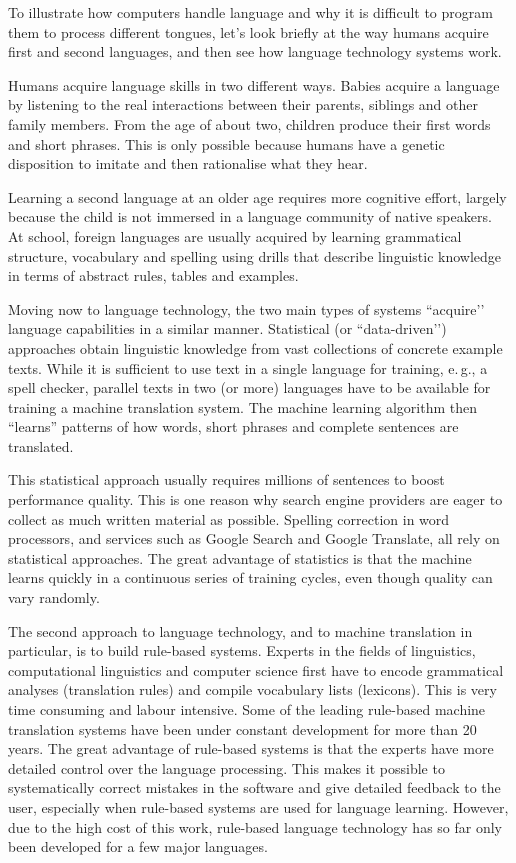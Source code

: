 \documentclass[]{../../metanetpaper}
\begin{document}
\begin{multicols}{2}
To illustrate how computers handle language and why it is difficult to program them to process different tongues, let’s look briefly at the way humans acquire first and second languages, and then see how language technology systems work.

Humans acquire language skills in two different ways. Babies acquire a language by listening to the real interactions between their parents, siblings and other family members. From the age of about two, children produce their first words and short phrases. This is only possible because humans have a genetic disposition to imitate and then rationalise what they hear. 

Learning a second language at an older age requires more cognitive effort, largely because the child is not immersed in a language community of native speakers. At school, foreign languages are usually acquired by learning grammatical structure, vocabulary and spelling using drills that describe linguistic knowledge in terms of abstract rules, tables and examples.


Moving now to language technology, the two main types of systems ``acquire'’ language capabilities in a similar manner. Statistical (or ``data-driven’') approaches obtain linguistic knowledge from vast collections of concrete example texts. While it is sufficient to use text in a single language for training, e.\,g., a spell checker, parallel texts in two (or more) languages have to be available for training a machine translation system. The machine learning algorithm then “learns” patterns of how words, short phrases and complete sentences are translated. 

This statistical approach usually requires millions of sentences to boost performance quality. This is one reason why search engine providers are eager to collect as much written material as possible. Spelling correction in word processors, and services such as Google Search and Google Translate, all rely on statistical approaches. The great advantage of statistics is that the machine learns quickly in a continuous series of training cycles, even though quality can vary randomly.

The second approach to language technology, and to machine translation in particular, is to build rule-based systems. Experts in the fields of linguistics, computational linguistics and computer science first have to encode grammatical analyses (translation rules) and compile vocabulary lists (lexicons). This is very time consuming and labour intensive. Some of the leading rule-based machine translation systems have been under constant development for more than 20 years. The great advantage of rule-based systems is that the experts have more detailed control over the language processing. This makes it possible to systematically correct mistakes in the software and give detailed feedback to the user, especially when rule-based systems are used for language learning. However, due to the high cost of this work, rule-based language technology has so far only been developed for a few major languages. 


\end{multicols}
\end{document}
